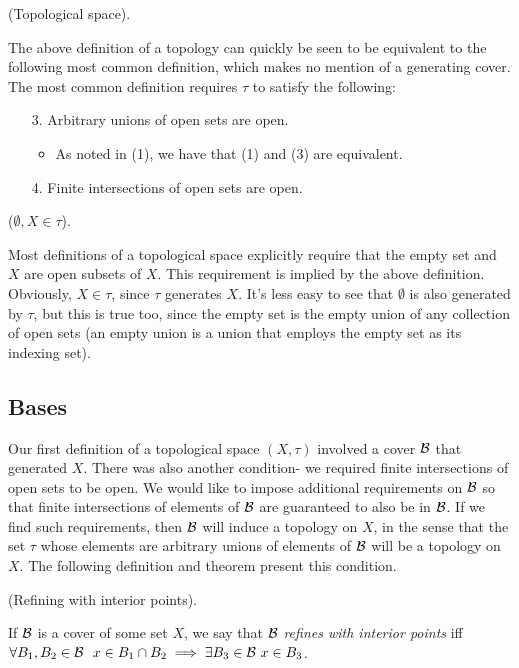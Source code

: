 \begin{defn}
    (Topological space).
    
    The above definition of a topology can quickly be seen to be equivalent to the following most common definition, which makes no mention of a generating cover. The most common definition requires $\tau$ to satisfy the following:

    \begin{enumerate}
        \item[3.] Arbitrary unions of open sets are open.
        \begin{itemize}
            \item As noted in (1), we have that (1) and (3) are equivalent.
        \end{itemize}
        \item[4.] Finite intersections of open sets are open.
    \end{enumerate}
\end{defn}

\begin{remark}
     ($\emptyset, X \in \tau$).
     
     Most definitions of a topological space explicitly require that the empty set and $X$ are open subsets of $X$. This requirement is implied by the above definition. Obviously, $X \in \tau$, since $\tau$ generates $X$. It's less easy to see that $\emptyset$ is also generated by $\tau$, but this is true too, since the empty set is the empty union of any collection of open sets (an empty union is a union that employs the empty set as its indexing set).
\end{remark}

\subsection*{Bases}

Our first definition of a topological space $(X, \tau)$ involved a cover $\mathcal{B}$ that generated $X$. There was also another condition- we required finite intersections of open sets to be open. We would like to impose additional requirements on $\mathcal{B}$ so that finite intersections of elements of $\mathcal{B}$ are guaranteed to also be in $\mathcal{B}$. If we find such requirements, then $\mathcal{B}$ will induce a topology on $X$, in the sense that the set $\tau$ whose elements are arbitrary unions of elements of $\mathcal{B}$ will be a topology on $X$. The following definition and theorem present this condition.

\begin{defn}
    (Refining with interior points).
    
    If $\mathcal{B}$ is a cover of some set $X$, we say that $\mathcal{B}$ \textit{refines with interior points} iff \\ ${\forall B_1, B_2 \in \mathcal{B} \text{ } \text{ } x \in B_1 \cap B_2 \implies \exists B_3 \in \mathcal{B} \text{ } x \in B_3}$.  
\end{defn}

